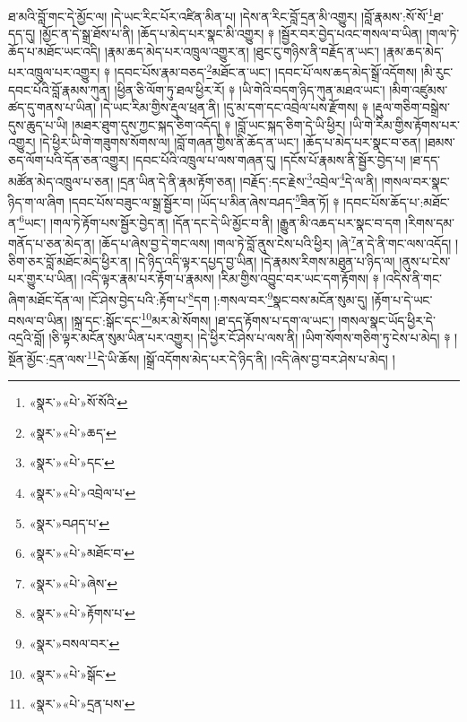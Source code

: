 ཐ་མའི་བློ་གང་དེ་མྱོང་ལ། །དེ་ཡང་རིང་པོར་འཛིན་མིན་པ། །དེས་ན་རིང་བློ་དྲན་མི་འགྱུར། །བློ་རྣམས་:སོ་སོ་\footnote{«སྣར་»«པེ་»སོ་སོའི་}ཐ་དད་དུ། །མྱོང་ན་དེ་སྒྲ་ཐོས་པ་ནི། །ཆོད་པ་མེད་པར་སྣང་མི་འགྱུར། ༈ །སྦྱོར་བར་བྱེད་པའང་གསལ་བ་ཡིན། །གལ་ཏེ་ཆོད་པ་མཐོང་ཡང་འདི། །རྣམ་ཆད་མེད་པར་འཁྲུལ་འགྱུར་ན། །ཐུང་ངུ་གཉིས་ནི་བརྗོད་ན་ཡང་། །རྣམ་ཆད་མེད་པར་འཁྲུལ་པར་འགྱུར། ༈ །དབང་པོས་རྣམ་བཅད་\footnote{«སྣར་»«པེ་»ཆད་}མཐོང་ན་ཡང་། །དབང་པོ་ལས་ཆད་མེད་སྒྲོ་འདོགས། །མི་རུང་དབང་པོའི་བློ་རྣམས་ཀུན། །ཕྱིན་ཅི་ལོག་ཏུ་ཐལ་ཕྱིར་རོ། ༈ །ཡི་གེའི་བདག་ཉིད་ཀུན་མཐའ་ཡང་། །མིག་འཛུམས་ཚད་དུ་གནས་པ་ཡིན། །དེ་ཡང་རིམ་གྱིས་རྡུལ་ཕྲན་ནི། །དུ་མ་དག་དང་འབྲེལ་པས་རྫོགས། ༈ །རྡུལ་གཅིག་བསྒྲེས་དུས་ཆུད་པ་ཡི། །མཐར་ཐུག་དུས་ཀྱང་སྐད་ཅིག་འདོད། ༈ །བློ་ཡང་སྐད་ཅིག་དེ་ཡི་ཕྱིར། །ཡི་གེ་རིམ་གྱིས་རྟོགས་པར་འགྱུར། །དེ་ཕྱིར་ཡི་གེ་གཟུགས་སོགས་ལ། །བློ་གཞན་གྱིས་ནི་ཆོད་ན་ཡང་། །ཆོད་པ་མེད་པར་སྣང་བ་ཅན། །ཐམས་ཅད་ལོག་པའི་དོན་ཅན་འགྱུར། །དབང་པོའི་འཁྲུལ་པ་ལས་གཞན་དུ། །དངོས་པོ་རྣམས་ནི་སྦྱོར་བྱེད་པ། །ཐ་དད་མཚོན་མེད་འཁྲུལ་པ་ཅན། །དྲན་ཡིན་དེ་ནི་རྣམ་རྟོག་ཅན། །བརྗོད་:དང་རྗེས་\footnote{«སྣར་»«པེ་»དང་}འབྲེལ་\footnote{«སྣར་»«པེ་»འབྲེལ་པ་}དེ་ལ་ནི། །གསལ་བར་སྣང་ཉིད་ག་ལ་ཞིག །དབང་པོས་བཟུང་ལ་སྒྲ་སྦྱོར་བ། །ཡོད་པ་མིན་ཞེས་བཤད་\footnote{«སྣར་»བཤད་པ་}ཟིན་ཏོ། ༈ །དབང་པོས་ཆོད་པ་:མཐོང་ན་\footnote{«སྣར་»«པེ་»མཐོང་བ་}ཡང་། །གལ་ཏེ་རྟོག་པས་སྦྱོར་བྱེད་ན། །དོན་དང་དེ་ཡི་མྱོང་བ་ནི། །རྒྱུན་མི་འཆད་པར་སྣང་བ་དག །རིགས་དམ་གནོད་པ་ཅན་མེད་ན། །ཆོད་པ་ཞེས་བྱ་དེ་གང་ལས། །གལ་ཏེ་བློ་ནུས་ངེས་པའི་ཕྱིར། །ཞེ་\footnote{«སྣར་»«པེ་»ཞེས་}ན་དེ་ནི་གང་ལས་འདོད། །ཅིག་ཅར་བློ་མཐོང་མེད་ཕྱིར་ན། །དེ་ཉིད་འདི་ལྟར་དཔྱད་བྱ་ཡིན། །དེ་རྣམས་རིགས་མཐུན་པ་ཉིད་ལ། །ནུས་པ་ངེས་པར་གྱུར་པ་ཡིན། །འདི་ལྟར་རྣམ་པར་རྟོག་པ་རྣམས། །རིམ་གྱིས་འབྱུང་བར་ཡང་དག་རྟོགས། ༈ །འདིས་ནི་གང་ཞིག་མཐོང་དོན་ལ། །ངོ་ཤེས་བྱེད་པའི་:རྟོག་པ་\footnote{«སྣར་»«པེ་»རྟོགས་པ་}དག །:གསལ་བར་\footnote{«སྣར་»བསལ་བར་}སྣང་བས་མངོན་སུམ་དུ། །རྟོག་པ་དེ་ཡང་བསལ་བ་ཡིན། །སྐྲ་དང་:སྒོང་དང་\footnote{«སྣར་»«པེ་»སྒོང་}མར་མེ་སོགས། །ཐ་དད་རྟོགས་པ་དག་ལ་ཡང་། །གསལ་སྣང་ཡོད་ཕྱིར་དེ་འདྲའི་བློ། །ཅི་ལྟར་མངོན་སུམ་ཡིན་པར་འགྱུར། །དེ་ཕྱིར་ངོ་ཤེས་པ་ལས་ནི། །ཡིག་སོགས་གཅིག་ཏུ་ངེས་པ་མེད། ༈ །སྔོན་མྱོང་:དྲན་ལས་\footnote{«སྣར་»«པེ་»དྲན་པས་}དེ་ཡི་ཆོས། །སྒྲོ་འདོགས་མེད་པར་དེ་ཉིད་ནི། །འདི་ཞེས་བྱ་བར་ཤེས་པ་མེད། །
